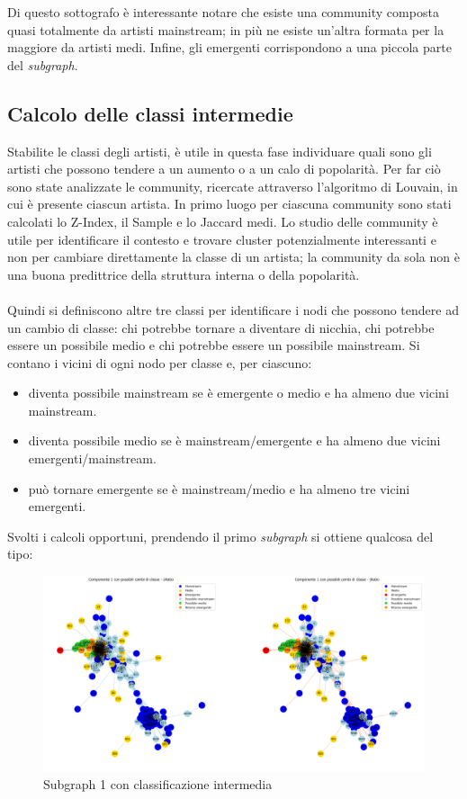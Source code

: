 \documentclass[sigchi]{acmart}
\begin{document}
\noindent Di questo sottografo è interessante notare che esiste una community composta quasi totalmente da artisti mainstream; in più ne esiste un'altra formata per la maggiore da artisti medi. Infine, gli emergenti corrispondono a una piccola parte del {\itshape subgraph}.

\subsection{Calcolo delle classi intermedie}

Stabilite le classi degli artisti, è utile in questa fase individuare quali sono gli artisti che possono tendere a un aumento o a un calo di popolarità. Per far ciò sono state analizzate le community, ricercate attraverso l'algoritmo di Louvain, in cui è presente ciascun artista. In primo luogo per ciascuna community sono stati calcolati lo Z-Index, il Sample e lo Jaccard medi. Lo studio delle community è utile per identificare il contesto e trovare cluster potenzialmente interessanti e non per cambiare direttamente la classe di un artista; la community da sola non è una buona predittrice della struttura interna o della popolarità.
 \\ \\ Quindi si definiscono altre tre classi per identificare i nodi che possono tendere ad un cambio di classe: chi potrebbe tornare a diventare di nicchia, chi potrebbe essere un possibile medio e chi potrebbe essere un possibile mainstream. Si contano i vicini di ogni nodo per classe e, per ciascuno:

\begin{itemize}
\item diventa possibile mainstream se è emergente o medio e ha almeno due vicini mainstream.
\item diventa possibile medio se è mainstream/emergente e ha almeno due vicini emergenti/mainstream.
\item può tornare emergente se è mainstream/medio e ha almeno tre vicini emergenti.
\end{itemize}
Svolti i calcoli opportuni, prendendo il primo {\itshape subgraph} si ottiene qualcosa del tipo:

\begin{figure}[H]
\centering
\includegraphics[width=0.45
\textwidth]{../open_problem/plots/3_3/subClSubgr_1.png}
\caption{Subgraph 1 con classificazione intermedia}
\label{fig:subClSubgr_1}
\end{figure}
\end{document}
